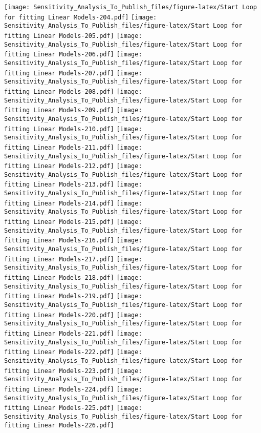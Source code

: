 \documentclass[
]{article}
\begin{document}
\texttt{[image: Sensitivity\_Analysis\_To\_Publish\_files/figure-latex/Start Loop for fitting Linear Models-204.pdf]}
\texttt{[image: Sensitivity\_Analysis\_To\_Publish\_files/figure-latex/Start Loop for fitting Linear Models-205.pdf]}
\texttt{[image: Sensitivity\_Analysis\_To\_Publish\_files/figure-latex/Start Loop for fitting Linear Models-206.pdf]}
\texttt{[image: Sensitivity\_Analysis\_To\_Publish\_files/figure-latex/Start Loop for fitting Linear Models-207.pdf]}
\texttt{[image: Sensitivity\_Analysis\_To\_Publish\_files/figure-latex/Start Loop for fitting Linear Models-208.pdf]}
\texttt{[image: Sensitivity\_Analysis\_To\_Publish\_files/figure-latex/Start Loop for fitting Linear Models-209.pdf]}
\texttt{[image: Sensitivity\_Analysis\_To\_Publish\_files/figure-latex/Start Loop for fitting Linear Models-210.pdf]}
\texttt{[image: Sensitivity\_Analysis\_To\_Publish\_files/figure-latex/Start Loop for fitting Linear Models-211.pdf]}
\texttt{[image: Sensitivity\_Analysis\_To\_Publish\_files/figure-latex/Start Loop for fitting Linear Models-212.pdf]}
\texttt{[image: Sensitivity\_Analysis\_To\_Publish\_files/figure-latex/Start Loop for fitting Linear Models-213.pdf]}
\texttt{[image: Sensitivity\_Analysis\_To\_Publish\_files/figure-latex/Start Loop for fitting Linear Models-214.pdf]}
\texttt{[image: Sensitivity\_Analysis\_To\_Publish\_files/figure-latex/Start Loop for fitting Linear Models-215.pdf]}
\texttt{[image: Sensitivity\_Analysis\_To\_Publish\_files/figure-latex/Start Loop for fitting Linear Models-216.pdf]}
\texttt{[image: Sensitivity\_Analysis\_To\_Publish\_files/figure-latex/Start Loop for fitting Linear Models-217.pdf]}
\texttt{[image: Sensitivity\_Analysis\_To\_Publish\_files/figure-latex/Start Loop for fitting Linear Models-218.pdf]}
\texttt{[image: Sensitivity\_Analysis\_To\_Publish\_files/figure-latex/Start Loop for fitting Linear Models-219.pdf]}
\texttt{[image: Sensitivity\_Analysis\_To\_Publish\_files/figure-latex/Start Loop for fitting Linear Models-220.pdf]}
\texttt{[image: Sensitivity\_Analysis\_To\_Publish\_files/figure-latex/Start Loop for fitting Linear Models-221.pdf]}
\texttt{[image: Sensitivity\_Analysis\_To\_Publish\_files/figure-latex/Start Loop for fitting Linear Models-222.pdf]}
\texttt{[image: Sensitivity\_Analysis\_To\_Publish\_files/figure-latex/Start Loop for fitting Linear Models-223.pdf]}
\texttt{[image: Sensitivity\_Analysis\_To\_Publish\_files/figure-latex/Start Loop for fitting Linear Models-224.pdf]}
\texttt{[image: Sensitivity\_Analysis\_To\_Publish\_files/figure-latex/Start Loop for fitting Linear Models-225.pdf]}
\texttt{[image: Sensitivity\_Analysis\_To\_Publish\_files/figure-latex/Start Loop for fitting Linear Models-226.pdf]}
\end{document}
